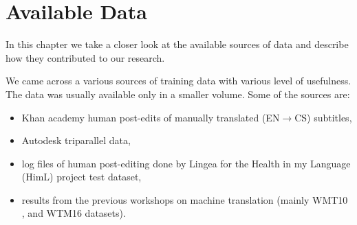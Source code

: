 \chapter{Available Data}
\label{chap:data}




In this chapter we take a closer look at the available
sources of data and describe how they contributed to our research.

We came across a various sources of training data with various level
of usefulness. The data was usually available only in a smaller volume. Some of the sources
are:
\begin{itemize}
\item Khan academy human
post-edits of manually translated (EN$\rightarrow$CS) subtitles,
\item Autodesk
triparallel data,
\item log files of human post-editing done by Lingea for the
Health in my Language (HimL) project test dataset,


\item results from the previous workshops on machine translation (mainly\linebreak
WMT10 \citep{callisonburch-EtAl:2010:WMT},
and WTM16 \citep{bojar-EtAl:2016:WMT1} datasets).
\end{itemize}

